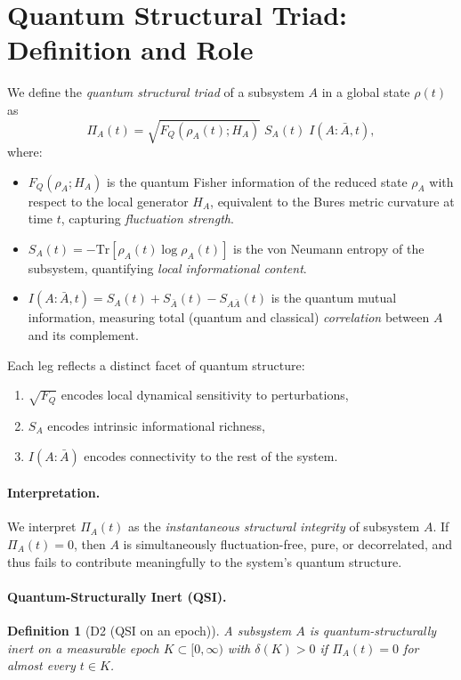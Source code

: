 \documentclass[10pt]{article}
\newtheorem{definition}{Definition}
\begin{document}
\section{Quantum Structural Triad: Definition and Role}

We define the \emph{quantum structural triad} of a subsystem $A$ in a global state $\rho(t)$ as
\begin{equation}
\Pi_A(t) = \sqrt{F_Q(\rho_A(t); H_A)} \; S_A(t) \; I(A:\bar{A},t),
\label{eq:triad}
\end{equation}
where:
\begin{itemize}
    \item $F_Q(\rho_A; H_A)$ is the quantum Fisher information of the reduced state $\rho_A$ with
    respect to the local generator $H_A$, equivalent to the Bures metric curvature at time $t$,
    capturing \emph{fluctuation strength}.
    \item $S_A(t) = -\mathrm{Tr}[\rho_A(t)\log \rho_A(t)]$ is the von Neumann entropy of the subsystem,
    quantifying \emph{local informational content}.
    \item $I(A:\bar{A},t) = S_A(t)+S_{\bar{A}}(t)-S_{A\bar{A}}(t)$ is the quantum mutual information,
    measuring total (quantum and classical) \emph{correlation} between $A$ and its complement.
\end{itemize}

Each leg reflects a distinct facet of quantum structure:
\begin{enumerate}
    \item $\sqrt{F_Q}$ encodes local dynamical sensitivity to perturbations,
    \item $S_A$ encodes intrinsic informational richness,
    \item $I(A:\bar{A})$ encodes connectivity to the rest of the system.
\end{enumerate}

\paragraph{Interpretation.}
We interpret $\Pi_A(t)$ as the \emph{instantaneous structural integrity} of subsystem $A$.
If $\Pi_A(t) = 0$, then $A$ is simultaneously fluctuation-free, pure, or decorrelated, and thus fails to
contribute meaningfully to the system's quantum structure.

\paragraph{Quantum-Structurally Inert (QSI).}
\begin{definition}[D2 (QSI on an epoch)]
A subsystem $A$ is \emph{quantum-structurally inert} on a measurable epoch $K\subset[0,\infty)$ with $\delta(K)>0$ if $\Pi_A(t)=0$ for almost every $t\in K$.
\end{definition}
\end{document}
